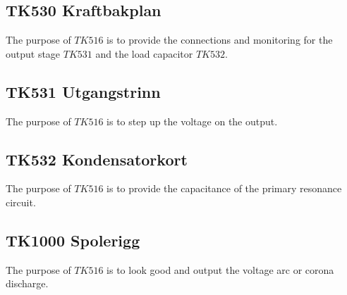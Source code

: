 \subsection{TK530 Kraftbakplan}
The purpose of $TK516$ is to provide the connections and monitoring for the output stage $TK531$ and the load capacitor $TK532$.

\subsection{TK531 Utgangstrinn}
The purpose of $TK516$ is to step up the voltage on the output.

\subsection{TK532 Kondensatorkort}
The purpose of $TK516$ is to provide the capacitance of the primary resonance circuit.

\subsection{TK1000 Spolerigg}
The purpose of $TK516$ is to look good and output the voltage arc or corona discharge.